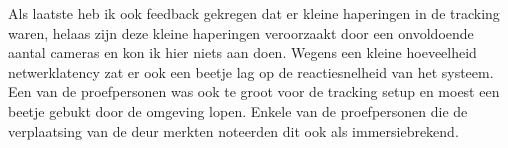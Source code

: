 Als laatste heb ik ook feedback gekregen dat er kleine haperingen in de tracking
waren, helaas zijn deze kleine haperingen veroorzaakt door een onvoldoende aantal
cameras en kon ik hier niets aan doen. Wegens een kleine hoeveelheid 
netwerklatency zat er ook een beetje lag op de reactiesnelheid van het systeem. 
Een van de proefpersonen was ook te groot voor de tracking setup en moest een
beetje gebukt door de omgeving lopen. Enkele van de proefpersonen die de 
verplaatsing van de deur merkten noteerden dit ook als immersiebrekend.